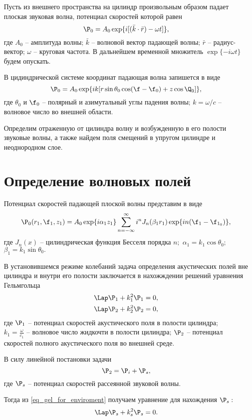 Пусть из внешнего пространства на цилиндр произвольным образом падает плоская звуковая волна, потенциал скоростей которой равен
$$\P_0=A_0 \exp\{i[(\bar{k}\cdot \bar{r})-\omega t]\},$$
где $A_0$ -- амплитуда волны; $\bar{k}$ -- волновой вектор падающей волны; $\bar{r}$ -- радиус-вектор; $\omega$ -- круговая частота. В дальнейшем временной множитель $\exp\{-i\omega t\}$ будем опускать.

В цидиндрической системе координат падающая волна запишется в виде
$$\P_0=A_0\exp\{ik[r\sin\theta_0\cos(\f-\f_0)+z\cos\Q_0]\},$$
где $\theta_0$ и $\f_0$ -- полярный и азимутальный углы падения волны; $k=\omega / c$ -- волновое число во внешней области.

Определим отраженную от цилиндра волну и возбужденную в его полости звуковые волны, а также найдем поля смещений в упругом цилиндре и неоднородном слое.

\newpage
\section{Определение волновых полей}

Потенциал скоростей падающей плоской волны представим в виде
$$\P_0(r_1, \f_1, z_1)=A_0\exp\{i\alpha_1 z_1\}\sum_{n=-\infty}^{\infty}i^nJ_n(\beta_1 r_1)\exp\{in(\f_1-\f_{1_0})\},$$
где $J_n(x)$ -- цилиндрическая функция Бесселя порядка $n;$ $\alpha_1=k_1\cos\theta_0;$ \\$\beta_1=k_1\sin\theta_0.$

В установившемся режиме колебаний задача определения акустических полей вне цилиндра и внутри его полости заключается в нахожждении решений уравнения Гельмгольца
\begin{align}
&\Lap\P_1+k_1^2\P_1=0,\\
&\Lap\P_2+k_2^2\P_2=0\label{eq_gel_for_enviroment},
\end{align}
где $\P_1$ -- потенциал скоростей акустического поля в полости цилиндра;\\ $k_1=\frac{\omega}{c_1}$ -- волновое число жидкочти в полости цилиндра;
$\P_{2}$ -- потенциал скоростей полного акустического поля во внешней среде. 

В силу линейной постановки задачи
\begin{equation}
\P_2=\P_i+\P_s,
\end{equation}
где $\P_s$ -- потенциал скоростей рассеянной звуковой волны.

Тогда из \eqref{eq_gel_for_enviroment} получаем уравнение для нахождения $\P_s:$
\begin{equation}\label{eq__gel_for_psi_s}
\Lap\P_s+k_s^2\P_s=0.
\end{equation}

